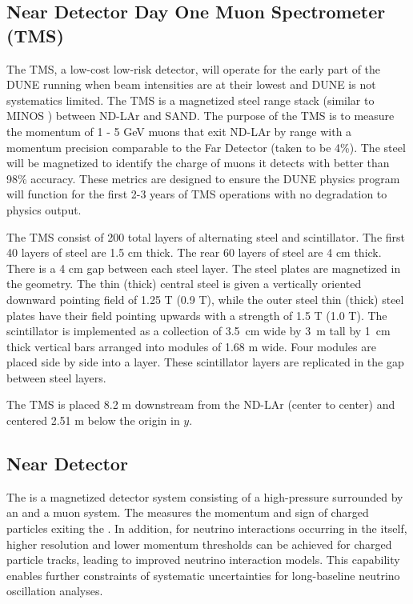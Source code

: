 \documentclass[../main-v1.tex]{subfiles}
\begin{document}

\subsection{Near Detector Day One Muon Spectrometer (TMS) }
\label{sec:comp-dataestimates-mpd}

The TMS, a low-cost low-risk detector, will operate for the early part of the DUNE running when beam intensities are at their lowest and DUNE is not systematics limited. The TMS is a magnetized steel range stack (similar to MINOS \cite{minosNIM}) between ND-LAr and SAND.  The purpose of the TMS is to measure the momentum of 1 - 5 GeV muons that exit ND-LAr by range with a momentum precision comparable to the Far Detector (taken to be 4\%). The steel will be magnetized to identify the charge of muons it detects with better than 98\% accuracy. These metrics are designed to ensure the DUNE physics program will function for the first 2-3 years of TMS operations with no degradation to physics output.

The TMS consist of 200 total layers of alternating steel and scintillator. The first 40 layers of steel are 1.5 cm thick. The rear 60 layers of steel are 4 cm thick. There is a 4 cm gap between each steel layer. The steel plates are magnetized in the geometry. The thin (thick) central steel is given a vertically oriented downward pointing field of 1.25 T (0.9 T), while the outer steel thin (thick) steel plates have their field pointing upwards with a strength of 1.5 T (1.0 T). The scintillator is implemented as a collection of 3.5~cm wide by 3~m tall by 1~cm thick vertical bars arranged into modules of 1.68 m wide. Four modules are placed side by side into a layer. These scintillator layers are replicated in the gap between steel layers.  

The TMS is placed 8.2 m downstream from the ND-LAr (center to center) and centered 2.51 m below the origin in $y$. 

\subsection{Near Detector  }
\label{sec:comp-dataestimates-mpd}

The  is a magnetized detector system consisting of a high-pressure  surrounded by an  and a muon system. The  measures the momentum and sign of charged particles exiting the . In addition, for neutrino interactions occurring in the  itself, higher resolution and lower momentum thresholds can be achieved for charged particle tracks, leading to improved neutrino interaction models. This capability enables further constraints of systematic uncertainties for long-baseline neutrino  oscillation analyses.
\end{document}
